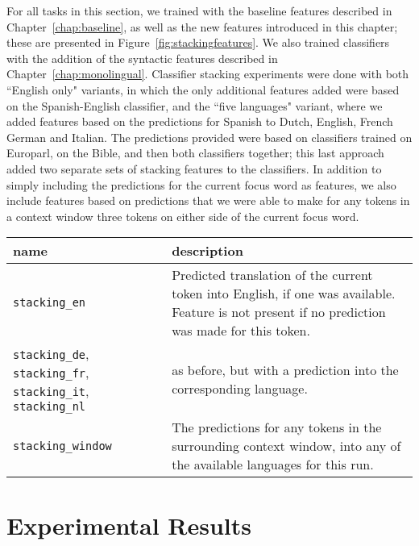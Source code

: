 For all tasks in this section, we trained with the baseline features described
in Chapter~\ref{chap:baseline}, as well as the new features introduced in this
chapter; these are presented in Figure~\ref{fig:stackingfeatures}.  We also
trained classifiers with the addition of the syntactic features described in
Chapter~\ref{chap:monolingual}. Classifier stacking experiments were done with
both ``English only" variants, in which the only additional features added were
based on the Spanish-English classifier, and the ``five languages" variant,
where we added features based on the predictions for Spanish to Dutch, English,
French German and Italian. The predictions provided were based on classifiers
trained on Europarl, on the Bible, and then both classifiers together; this
last approach added two separate sets of stacking features to the classifiers.
In addition to simply including the predictions for the current focus word as
features, we also include features based on predictions that we were able to
make for any tokens in a context window three tokens on either side of the
current focus word.

\begin{figure*}
  \begin{centering}
  \begin{tabular}{|p{3.5cm}|p{11cm}|}
    \hline
    name          & description  \\
    \hline
    \texttt{stacking\_en} & Predicted translation of the current token into
    English, if one was available. Feature is not present if no prediction was
    made for this token. \\
    \hline
    \texttt{stacking\_de}, \texttt{stacking\_fr}, \texttt{stacking\_it},
    \texttt{stacking\_nl} & as before, but with a prediction into the
    corresponding language.\\
    \hline
    \texttt{stacking\_window} & The predictions for any tokens in the
    surrounding context window, into any of the available languages for this
    run. \\
    \hline
  \end{tabular}
  \end{centering}
  \caption{Classifier features based on classifier stacking, used in these
  experiments}
  \label{fig:stackingfeatures}
\end{figure*}

\section{Experimental Results}
\label{sec:multilingual-results}

